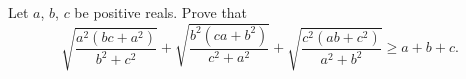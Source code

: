 Let $a$, $b$, $c$ be positive reals.  Prove that \[ \sqrt{\frac{a^2(bc+a^2)}{b^2+c^2}}+\sqrt{\frac{b^2(ca+b^2)}{c^2+a^2}}+\sqrt{\frac{c^2(ab+c^2)}{a^2+b^2}}\ge a+b+c. \]